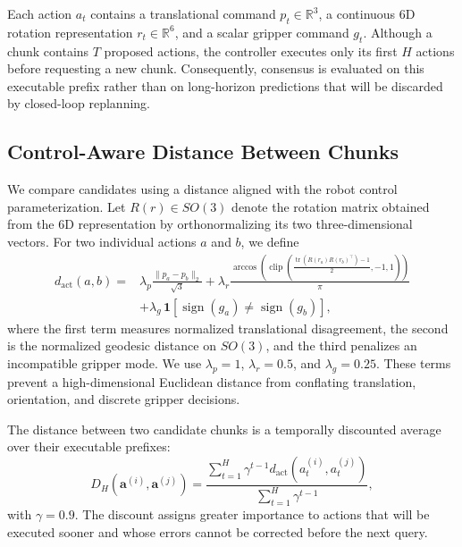\documentclass{article}
\begin{document}
Each action $a_t$ contains a translational command $p_t\in\mathbb{R}^3$, a
continuous 6D rotation representation $r_t\in\mathbb{R}^6$, and a scalar
gripper command $g_t$. Although a chunk contains $T$ proposed actions, the
controller executes only its first $H$ actions before requesting a new chunk.
Consequently, consensus is evaluated on this executable prefix rather than on
long-horizon predictions that will be discarded by closed-loop replanning.

\subsection{Control-Aware Distance Between Chunks}

We compare candidates using a distance aligned with the robot control
parameterization. Let $R(r)\in SO(3)$ denote the rotation matrix obtained from
the 6D representation by orthonormalizing its two three-dimensional vectors.
For two individual actions $a$ and $b$, we define
\begin{equation}
\begin{split}
    d_{\mathrm{act}}(a,b) ={}& \lambda_p\frac{\lVert p_a-p_b\rVert_2}{\sqrt{3}}
    + \lambda_r\frac{\arccos\!\left(
        \operatorname{clip}\!\left(
        \frac{\operatorname{tr}(R(r_a)R(r_b)^\top)-1}{2},-1,1
        \right)\right)}{\pi} \\
    &+ \lambda_g\,\mathbf{1}\!\left[\operatorname{sign}(g_a)
        \neq \operatorname{sign}(g_b)\right],
    \label{eq:action-distance}
\end{split}
\end{equation}
where the first term measures normalized translational disagreement, the second
is the normalized geodesic distance on $SO(3)$, and the third penalizes an
incompatible gripper mode. We use $\lambda_p=1$, $\lambda_r=0.5$, and
$\lambda_g=0.25$. These terms prevent a high-dimensional Euclidean distance
from conflating translation, orientation, and discrete gripper decisions.

The distance between two candidate chunks is a temporally discounted average
over their executable prefixes:
\begin{equation}
    D_H\!\left(\mathbf{a}^{(i)},\mathbf{a}^{(j)}\right)
    =
    \frac{\sum_{t=1}^{H}\gamma^{t-1}
    d_{\mathrm{act}}\!\left(a^{(i)}_t,a^{(j)}_t\right)}
    {\sum_{t=1}^{H}\gamma^{t-1}},
    \label{eq:chunk-distance}
\end{equation}
with $\gamma=0.9$. The discount assigns greater importance to actions that
will be executed sooner and whose errors cannot be corrected before the next
query.
\end{document}
